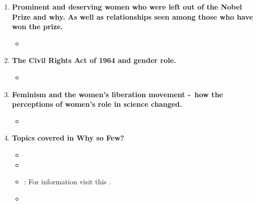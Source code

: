 \documentclass[12pt,a4paper]{article}
\begin{document}
\begin{enumerate}
\begin{itemize}
    \end{itemize}
    \item {} \textbf{Prominent and deserving women who were left out of the Nobel Prize and why. As well as relationships seen among those who have won the prize.}
    \begin{itemize}
      \item
    \end{itemize}
    \item {} \textbf{The Civil Rights Act of 1964 and gender role.}
    \begin{itemize}
      \item 
    \end{itemize}
    \item {} \textbf{Feminism and the women’s liberation movement -\ how the perceptions of women's role in science changed.}
    \begin{itemize}
      \item
    \end{itemize}
    \item \textbf{Topics covered in Why so Few?}
    \begin{itemize} 
      \item {}%
      \item {}%
      \item {}: For information visit this \href{https://search-proquest-com.libproxy.csun.edu/docview/208113208/fulltext/4CDEBE29EC114546PQ/1?accountid=7285}{}.
      \item {}

\end{itemize}
\end{enumerate}
\end{document}
